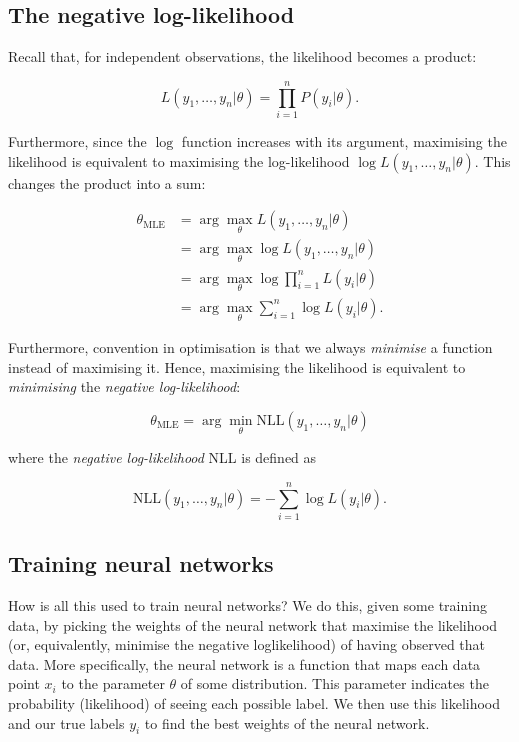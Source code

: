 \documentclass[11pt]{article}
\begin{document}
    \hypertarget{the-negative-log-likelihood}{%
\subsection{The negative
log-likelihood}\label{the-negative-log-likelihood}}

Recall that, for independent observations, the likelihood becomes a
product:

\[
L(y_1, \ldots, y_n | \theta) = \prod_{i=1}^n P(y_i | \theta).
\]

Furthermore, since the \(\log\) function increases with its argument,
maximising the likelihood is equivalent to maximising the log-likelihood
\(\log L(y_1, \ldots, y_n | \theta)\). This changes the product into a
sum:

\[
\begin{align}
\theta_{\text{MLE}} &= \arg \max_{\theta} L(y_1, \ldots, y_n | \theta) \\
&= \arg \max_{\theta} \log L(y_1, \ldots, y_n | \theta) \\
&= \arg \max_{\theta} \log \prod_{i=1}^n L(y_i | \theta) \\
&= \arg \max_{\theta} \sum_{i=1}^n \log L(y_i | \theta).
\end{align}
\]

Furthermore, convention in optimisation is that we always
\emph{minimise} a function instead of maximising it. Hence, maximising
the likelihood is equivalent to \emph{minimising} the \emph{negative
log-likelihood}:

\[
\theta_{\text{MLE}} = \arg \min_{\theta} \text{NLL}(y_1, \ldots, y_n | \theta)
\]

where the \emph{negative log-likelihood} NLL is defined as

\[
\text{NLL}(y_1, \ldots, y_n | \theta) = - \sum_{i=1}^n \log L(y_i | \theta).
\]

    \hypertarget{training-neural-networks}{%
\subsection{Training neural networks}\label{training-neural-networks}}

How is all this used to train neural networks? We do this, given some
training data, by picking the weights of the neural network that
maximise the likelihood (or, equivalently, minimise the negative
loglikelihood) of having observed that data. More specifically, the
neural network is a function that maps each data point \(x_i\) to the
parameter \(\theta\) of some distribution. This parameter indicates the
probability (likelihood) of seeing each possible label. We then use this
likelihood and our true labels \(y_i\) to find the best weights of the
neural network.
\end{document}

